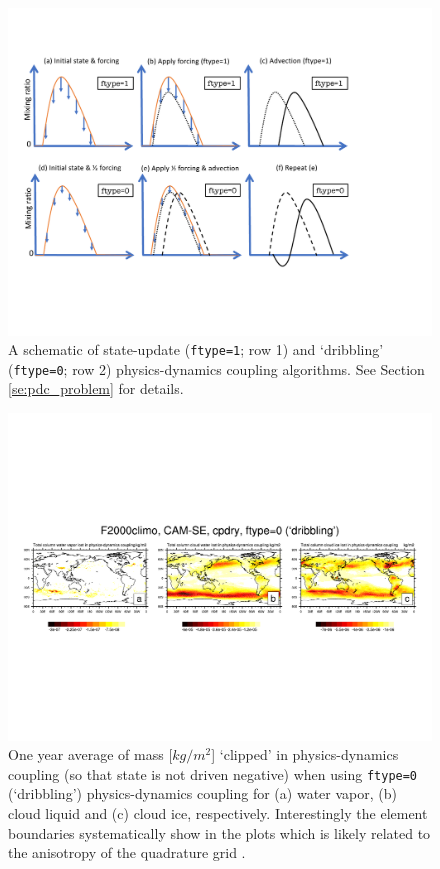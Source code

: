 \documentclass{agujournal}
\begin{document}
 \begin{figure}[h]
 \centering
 \includegraphics[width=35pc]{figs/ftype_schematic.pdf}
 \caption{A schematic of state-update ({\tt{ftype=1}}; row 1) and `dribbling' ({\tt{ftype=0}}; row 2) physics-dynamics coupling algorithms. See Section \ref{se:pdc_problem} for details.}
 \label{fig:ftype_schematic}
  \end{figure}



 \begin{figure}
 \centering
 \includegraphics[width=55pc]{figs/pdc.pdf}
 \caption{One year average of mass [$kg/m^2$] `clipped' in physics-dynamics coupling (so that state is not driven negative) when using {\tt{ftype=0}} (`dribbling') physics-dynamics coupling for (a) water vapor, (b) cloud liquid and (c) cloud ice, respectively. Interestingly the element boundaries systematically show in the plots which is likely related to the anisotropy of the quadrature grid \citep{HetAl2018MWR}.}
 \label{fig:pdc}
  \end{figure}
\end{document}
